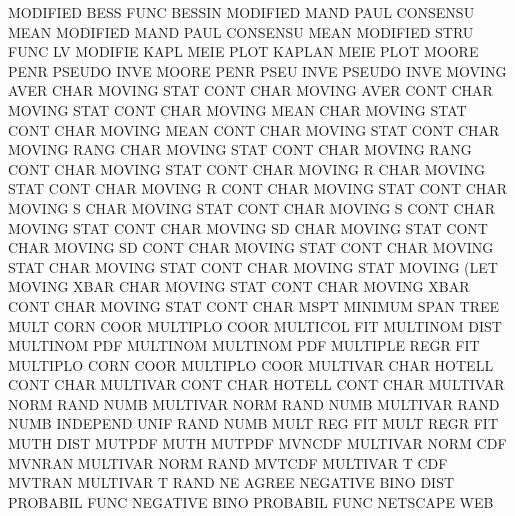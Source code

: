 MODIFIED BESS FUNC                      BESSIN
MODIFIED MAND PAUL                      CONSENSU MEAN
MODIFIED MAND PAUL                      CONSENSU MEAN
MODIFIED STRU FUNC                      LV
MODIFIE  KAPL MEIE PLOT                 KAPLAN   MEIE PLOT
MOORE    PENR                           PSEUDO   INVE
MOORE    PENR PSEU INVE                 PSEUDO   INVE
MOVING   AVER CHAR                      MOVING   STAT CONT CHAR
MOVING   AVER CONT CHAR                 MOVING   STAT CONT CHAR
MOVING   MEAN CHAR                      MOVING   STAT CONT CHAR
MOVING   MEAN CONT CHAR                 MOVING   STAT CONT CHAR
MOVING   RANG CHAR                      MOVING   STAT CONT CHAR
MOVING   RANG CONT CHAR                 MOVING   STAT CONT CHAR
MOVING   R    CHAR                      MOVING   STAT CONT CHAR
MOVING   R    CONT CHAR                 MOVING   STAT CONT CHAR
MOVING   S    CHAR                      MOVING   STAT CONT CHAR
MOVING   S    CONT CHAR                 MOVING   STAT CONT CHAR
MOVING   SD   CHAR                      MOVING   STAT CONT CHAR
MOVING   SD   CONT CHAR                 MOVING   STAT CONT CHAR
MOVING   STAT CHAR                      MOVING   STAT CONT CHAR
MOVING   STAT                           MOVING   (LET
MOVING   XBAR CHAR                      MOVING   STAT CONT CHAR
MOVING   XBAR CONT CHAR                 MOVING   STAT CONT CHAR
MSPT                                    MINIMUM  SPAN TREE
MULT     CORN COOR                      MULTIPLO COOR
MULTICOL                                FIT
MULTINOM DIST                           MULTINOM PDF
MULTINOM                                MULTINOM PDF
MULTIPLE REGR                           FIT
MULTIPLO CORN COOR                      MULTIPLO COOR
MULTIVAR CHAR                           HOTELL   CONT CHAR
MULTIVAR CONT CHAR                      HOTELL   CONT CHAR
MULTIVAR NORM RAND NUMB                 MULTIVAR NORM RAND NUMB
MULTIVAR RAND NUMB                      INDEPEND UNIF RAND NUMB
MULT     REG                            FIT
MULT     REGR                           FIT
MUTH     DIST                           MUTPDF
MUTH                                    MUTPDF
MVNCDF                                  MULTIVAR NORM CDF
MVNRAN                                  MULTIVAR NORM RAND
MVTCDF                                  MULTIVAR T    CDF
MVTRAN                                  MULTIVAR T    RAND
NE                                      AGREE
NEGATIVE BINO DIST                      PROBABIL FUNC
NEGATIVE BINO                           PROBABIL FUNC
NETSCAPE                                WEB
